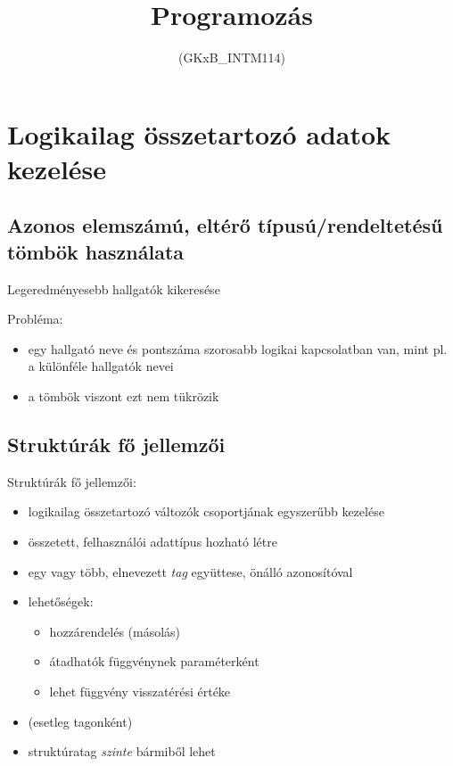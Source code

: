 \documentclass[usenames,dvipsnames,aspectratio=169]{beamer}
\title[6. előadás]{Programozás}
\subtitle{(GKxB\_INTM114)}
\begin{document}
\begin{frame}[plain]
  \titlepage
  \logoalul
\end{frame}

\section{Logikailag összetartozó adatok kezelése}
\subsection{Azonos elemszámú, eltérő típusú/rendeltetésű tömbök használata}
\begin{frame}
  \begin{exampleblock}{ Legeredményesebb hallgatók kikeresése}
    \scriptsize
    
  \end{exampleblock}
\end{frame}

\begin{frame}
  \begin{exampleblock}{}
    \scriptsize
    
  \end{exampleblock}
  \vfill
  Probléma:
  \begin{itemize}
    \item egy hallgató neve és pontszáma szorosabb logikai kapcsolatban van, mint pl. a különféle hallgatók nevei
    \item a tömbök viszont ezt nem tükrözik
  \end{itemize}
\end{frame}

\subsection{Struktúrák fő jellemzői}
\begin{frame}
  Struktúrák fő jellemzői:
  \begin{itemize}
    \item logikailag összetartozó változók csoportjának egyszerűbb kezelése
    \item összetett, felhasználói adattípus hozható létre
    \item egy vagy több, elnevezett \emph{tag} együttese, önálló azonosítóval
    \item lehetőségek:
    \begin{itemize}
      \item hozzárendelés (másolás)
      \item átadhatók függvénynek paraméterként
      \item lehet függvény visszatérési értéke
    \end{itemize}
    \item {} (esetleg tagonként)
    \item struktúratag \emph{szinte} bármiből lehet
  \end{itemize}
\end{frame}
\end{document}
